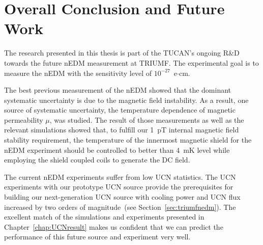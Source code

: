 \section{Overall Conclusion and Future Work}
The research presented in this thesis is part of the TUCAN's ongoing
R\&D towards the future nEDM measurement at TRIUMF. The experimental
goal is to measure the nEDM with the sensitivity level of
$10^{-27}$~e$\cdot$cm.

The best previous measurement of the nEDM showed that the dominant
systematic uncertainty is due to the magnetic field instability. As a
result, one source of systematic uncertainty, the temperature
dependence of magnetic permeability $\mu$, was studied. The result of
those measurements as well as the relevant simulations showed that, to
fulfill our 1~pT internal magnetic field stability requirement, the
temperature of the innermost magnetic shield for the nEDM experiment
should be controlled to better than 4~mK level while employing the
shield coupled coils to generate the DC field.

The current nEDM experiments suffer from low UCN statistics. The UCN
experiments with our prototype UCN source provide the prerequisites
for building our next-generation UCN source with cooling power and UCN
flux increased by two orders of magnitude~(see
Section~\ref{sec:triumfnedm}). The excellent match of the simulations
and experiments presented in Chapter~\ref{chap:UCNresult} makes us
confident that we can predict the performance of this future source
and experiment very well.











